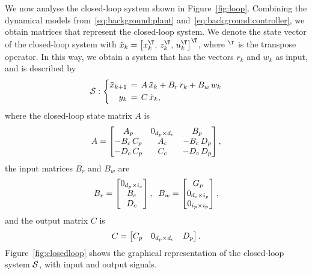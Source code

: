 We now analyse the closed-loop system shown in Figure~\ref{fig:loop}.
Combining the dynamical models from~\eqref{eq:background:plant} and~\eqref{eq:background:controller}, we obtain matrices that represent the closed-loop system.
We denote the state vector of the closed-loop system with $\tilde{x}_k = \left[ x_k^\T,\, z_k^\T,\, u_k^\T \right]^\T$, where $^\T$ is the transpose operator.
In this way, we obtain a system that has the vectors $r_k$ and $w_k$ as input, and is described by
%
\begin{equation} 
\label{eq:feedback-basic}
    \mathcal{S} : \left\{
    \begin{aligned}
        \tilde{x}_{k+1} &\,=\, A\,\tilde{x}_{k} + B_r\,r_{k} + B_w\,w_{k}\\
        y_{k} &\,=\, C\,\tilde{x}_{k},
    \end{aligned} \right.
\end{equation}
%
where the closed-loop state matrix $A$ is
%
\begin{equation}
\label{eq:matrixA}
    A =
    \begin{bmatrix} A_p       & 0_{d_p \times d_c} & B_p \\
                    -B_c\,C_p & A_c                                      & -B_c\,D_p \\
                    -D_c\,C_p & C_c                                      & -D_c\,D_p
    \end{bmatrix},
\end{equation}
%
the input matrices $B_r$ and $B_w$ are
%
\begin{equation}
    B_r = \begin{bmatrix} 0_{d_p \times i_c} \\ B_c \\ D_c \end{bmatrix},\;\;
    B_w = \begin{bmatrix} G_p \\ 0_{d_c \times i_p} \\ 0_{i_p \times i_p} \end{bmatrix},
\end{equation}
%
and the output matrix $C$ is
%
\begin{equation}
    C = \begin{bmatrix} C_p & 0_{d_p \times d_c} & D_p \end{bmatrix}.
\end{equation}
%
Figure~\ref{fig:closedloop} shows the graphical representation of the closed-loop system $\mathcal{S}$, with input and output signals.

